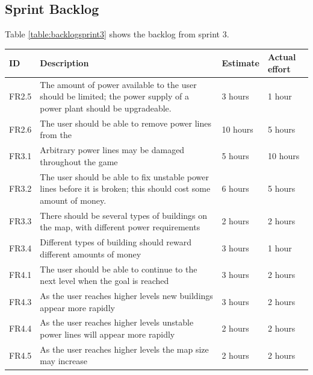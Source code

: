 \clearpage
\subsection{Sprint Backlog}

Table \ref{table:backlogsprint3} shows the backlog from sprint 3.

	\begin{table}[H]
	\begin{tabular}{| p{1cm} | p{7cm} | p{2cm} | p{2cm} |}
		\hline
		\rowcolor{gray}
		ID & Description & Estimate & Actual effort \\ \hline

		FR2.5 & The amount of power available to the user should be limited; 
		the power supply of a power plant should be upgradeable. 
		& 3 hours  & 1 hour \\ \hline

		FR2.6 & The user should be able to remove power lines from the 
		& 10 hours & 5 hours \\ \hline

		FR3.1 & Arbitrary power lines may be damaged throughout the game 
		& 5 hours & 10 hours \\ \hline

		FR3.2 & The user should be able to fix unstable power lines before it is 
		broken; this should cost some amount of money. 
		& 6 hours & 5 hours \\ \hline

		FR3.3 & There should be several types of buildings on the map, with different 
		power requirements 
		& 2 hours & 2 hours \\ \hline

		FR3.4 & Different types of building should reward different amounts of 
		money 
		& 3 hours & 1 hour \\ \hline

		FR4.1 & The user should be able to continue to the next level when the goal is 
		reached 
		& 3 hours & 2 hours \\ \hline

		FR4.3 & As the user reaches higher levels new buildings appear more 
		rapidly 
		& 3 hours & 2 hours \\ \hline

		FR4.4 & As the user reaches higher levels unstable power lines will appear 
		more rapidly 
		& 2 hours & 2 hours \\ \hline

		FR4.5 & As the user reaches higher levels the map size may increase 
		& 2 hours & 2 hours \\ \hline


\end{tabular}
\end{table}
